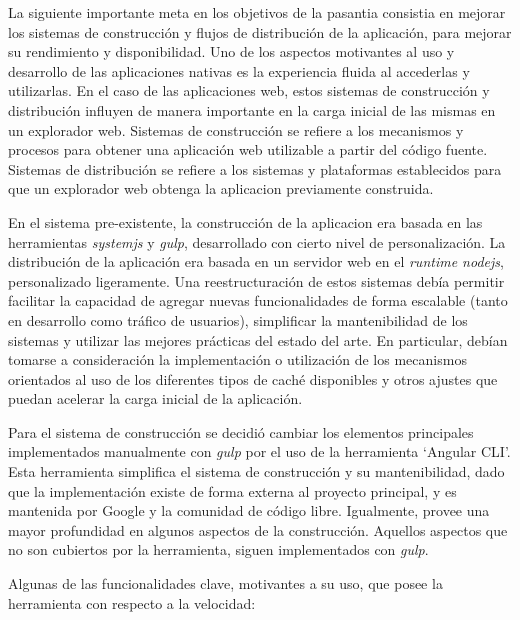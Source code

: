 La siguiente importante meta en los objetivos de la pasantia consistia en mejorar los sistemas de construcción y flujos de distribución de la aplicación, para mejorar su rendimiento y disponibilidad. Uno de los aspectos motivantes al uso y desarrollo de las aplicaciones nativas es la experiencia fluida al accederlas y utilizarlas. En el caso de las aplicaciones web, estos sistemas de construcción y distribución influyen de manera importante en la carga inicial de las mismas en un explorador web. Sistemas de construcción se refiere a los mecanismos y procesos para obtener una aplicación web utilizable a partir del código fuente. Sistemas de distribución se refiere a los sistemas y plataformas establecidos para que un explorador web obtenga la aplicacion previamente construida.

En el sistema pre-existente, la construcción de la aplicacion era basada en las herramientas \textit{systemjs} y \textit{gulp}, desarrollado con cierto nivel de personalización. La distribución de la aplicación era basada en un servidor web en el \textit{runtime nodejs}, personalizado ligeramente. Una reestructuración de estos sistemas debía permitir facilitar la capacidad de agregar nuevas funcionalidades de forma escalable (tanto en desarrollo como tráfico de usuarios), simplificar la mantenibilidad de los sistemas y utilizar las mejores prácticas del estado del arte. En particular, debían tomarse a consideración la implementación o utilización de los mecanismos orientados al uso de los diferentes tipos de caché disponibles y otros ajustes que puedan acelerar la carga inicial de la aplicación.

Para el sistema de construcción se decidió cambiar los elementos principales implementados manualmente con \textit{gulp} por el uso de la herramienta `Angular CLI'. Esta herramienta simplifica el sistema de construcción y su mantenibilidad, dado que la implementación existe de forma externa al proyecto principal, y es mantenida por Google y la comunidad de código libre. Igualmente, provee una mayor profundidad en algunos aspectos de la construcción. Aquellos aspectos que no son cubiertos por la herramienta, siguen implementados con \textit{gulp}.

Algunas de las funcionalidades clave, motivantes a su uso, que posee la herramienta con respecto a la velocidad:

